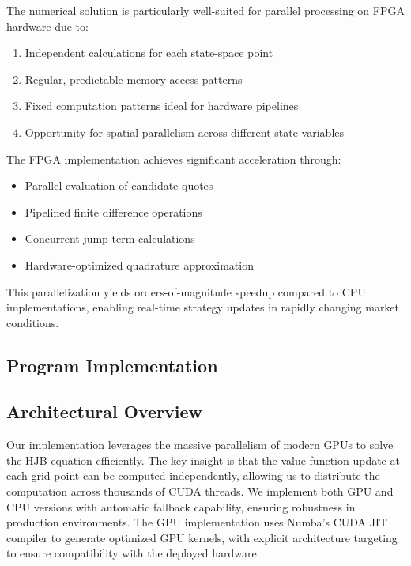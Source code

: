 \documentclass[twocolumn,11pt]{IEEEtran}  %
\begin{document}
\begin{onecolumn}
The numerical solution is particularly well-suited for parallel processing on FPGA hardware due to:

\begin{enumerate}
    \item Independent calculations for each state-space point
    \item Regular, predictable memory access patterns 
    \item Fixed computation patterns ideal for hardware pipelines
    \item Opportunity for spatial parallelism across different state variables
\end{enumerate}

The FPGA implementation achieves significant acceleration through:
\begin{itemize}
    \item Parallel evaluation of candidate quotes
    \item Pipelined finite difference operations
    \item Concurrent jump term calculations
    \item Hardware-optimized quadrature approximation
\end{itemize}

This parallelization yields orders-of-magnitude speedup compared to CPU implementations, enabling real-time strategy updates in rapidly changing market conditions.
\begin{onecolumn}
    
\section{Program Implementation}
\subsection{Architectural Overview}

Our implementation leverages the massive parallelism of modern GPUs to solve the HJB equation efficiently. The key insight is that the value function update at each grid point can be computed independently, allowing us to distribute the computation across thousands of CUDA threads. We implement both GPU and CPU versions with automatic fallback capability, ensuring robustness in production environments. The GPU implementation uses Numba's CUDA JIT compiler to generate optimized GPU kernels, with explicit architecture targeting to ensure compatibility with the deployed hardware.


\end{onecolumn}
\end{onecolumn}
\end{document}
